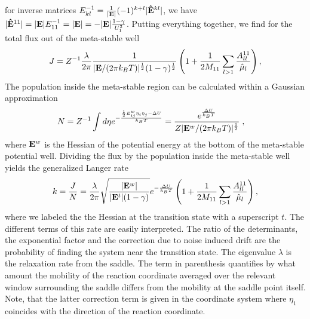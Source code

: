 for inverse matrices  $E^{-1}_{kl}=\frac{1}{|\mathbf{E}|} (-1)^{k+l}|\mathbf{\hat{E}}^{kl}|$, we have
$|\mathbf{\hat{E}}^{11}|=|\mathbf{E}|E^{-1}_{11}=|\mathbf{E}|=-|\mathbf{E}|\frac{1-\gamma}{U_1^{2}}$.
Putting everything together, we find for the total flux out of the meta-stable well
\begin{equation}
\begin{split}
J=Z^{-1}\frac{\lambda}{2\pi}\frac{1}{|\mathbf{E}/(2\pi k_BT)|^{\frac{1}{2}}(1-\gamma)^{\frac{1}{2}}}\left(1+\frac{1}{2 M_{11}}\sum_{l>1} \frac{A^{11}_{ll}}{\hat{\mu}_l}\right),
\end{split}
\end{equation}
The population inside the meta-stable region can be calculated within a Gaussian approximation
\begin{equation}
\begin{split}
\label{eq:pop_in_meta}
N %
&=Z^{-1}\int d\eta e^{-\frac{\frac{1}{2}\UHessc^{w}_{ij}\eta_i\eta_j-\dU}{\kT}}
=\frac{e^{\frac{\dU}{\kT}}}{Z|\UHess^{w}/(2\pi\kT)|^{\frac{1}{2}}}\;,
\end{split}
\end{equation}
where $\mathbf{E}^{w}$ is the Hessian of the potential energy at the bottom of the meta-stable potential 
well. Dividing the flux by the population inside the meta-stable well yields the generalized Langer 
rate  
\begin{equation}
\label{eq:genLangerrate}
k=\frac{J}{N}=\frac{\lambda}{2\pi}
\sqrt{\frac{|\mathbf{E}^{w}|}{|\mathbf{E}^{t}|(1-\gamma)}}e^{-\frac{\Delta U}{k_BT}}
\left(1+\frac{1}{2 M_{11}}\sum_{l>1} \frac{A^{11}_{ll}}{\hat{\mu}_l}\right),
\end{equation}
where we labeled the the Hessian at the transition state with a superscript $t$.  
The different terms of this rate are easily interpreted. The ratio of the determinants, the exponential
factor and the correction due to noise induced drift are the probability of finding the system near 
the transition state. The eigenvalue $\lambda$ is the relaxation rate from the saddle.
The term in parenthesis quantifies by what amount the mobility of the reaction coordinate
averaged over the relevant window surrounding the saddle differs from the mobility at the saddle point itself.
Note, that the latter correction term is given in the coordinate system where $\eta_1$ coincides with the
direction of the reaction coordinate. 


